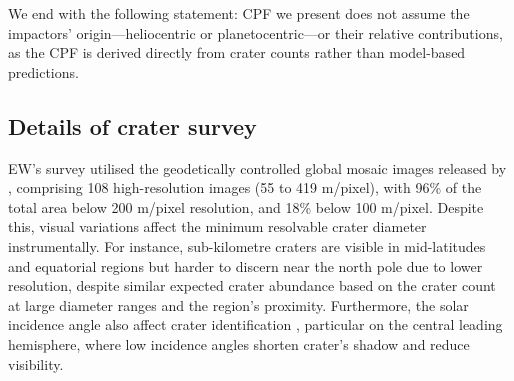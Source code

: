 \documentclass[preprint,12pt,3p,times,authoryear]{elsarticle}
\begin{document}
We end with the following statement: CPF we present does not assume the impactors' origin—heliocentric or planetocentric—or their relative contributions, as the CPF is derived directly from crater counts rather than model-based predictions.



\subsection{Details of crater survey}
\label{sub:survey}
EW’s survey utilised the geodetically controlled global mosaic images released by \citet{Bland2018}, comprising 108 high-resolution images (55 to 419 m/pixel), with 96\% of the total area below 200 m/pixel resolution, and 18\% below 100 m/pixel. Despite this, visual variations affect the minimum resolvable crater diameter instrumentally. For instance, sub-kilometre craters are visible in mid-latitudes and equatorial regions but harder to discern near the north pole due to lower resolution, despite similar expected crater abundance based on the crater count at large diameter ranges and the region’s proximity. Furthermore, the solar incidence angle also affect crater identification \citep{Ostrach2011}, particular on the central leading hemisphere, where low incidence angles shorten crater's shadow and reduce visibility.\\
\end{document}
